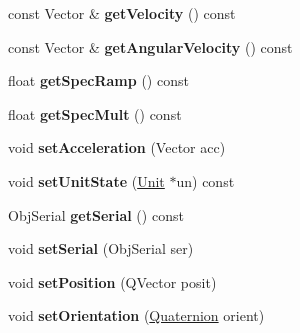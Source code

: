 \begin{DoxyCompactItemize}
\item 
const Vector \& {\bfseries get\+Velocity} () const \hypertarget{classClientState_a68087f4461e6837a58a32d695d1bbfd0}{}\label{classClientState_a68087f4461e6837a58a32d695d1bbfd0}

\item 
const Vector \& {\bfseries get\+Angular\+Velocity} () const \hypertarget{classClientState_ac19050a6f29a6f5a6e5f9dd0d5b5c216}{}\label{classClientState_ac19050a6f29a6f5a6e5f9dd0d5b5c216}

\item 
float {\bfseries get\+Spec\+Ramp} () const \hypertarget{classClientState_a9a1d6c1f4080ea5e6fb100fa4d7b4242}{}\label{classClientState_a9a1d6c1f4080ea5e6fb100fa4d7b4242}

\item 
float {\bfseries get\+Spec\+Mult} () const \hypertarget{classClientState_ae02b427f1c3439fa9c6752d1dcc9e4ab}{}\label{classClientState_ae02b427f1c3439fa9c6752d1dcc9e4ab}

\item 
void {\bfseries set\+Acceleration} (Vector acc)\hypertarget{classClientState_a812fa6fb3d2949775e90ba5134847d4c}{}\label{classClientState_a812fa6fb3d2949775e90ba5134847d4c}

\item 
void {\bfseries set\+Unit\+State} (\hyperlink{classUnit}{Unit} $\ast$un) const \hypertarget{classClientState_aec621385e79d33a80f21097a970c7912}{}\label{classClientState_aec621385e79d33a80f21097a970c7912}

\item 
Obj\+Serial {\bfseries get\+Serial} () const \hypertarget{classClientState_ab4e2ff85df0857c600b265b9459b92ad}{}\label{classClientState_ab4e2ff85df0857c600b265b9459b92ad}

\item 
void {\bfseries set\+Serial} (Obj\+Serial ser)\hypertarget{classClientState_abb156ffb85a143d472de857783ec0486}{}\label{classClientState_abb156ffb85a143d472de857783ec0486}

\item 
void {\bfseries set\+Position} (Q\+Vector posit)\hypertarget{classClientState_af4dab10fa684d59375402aa5f575b167}{}\label{classClientState_af4dab10fa684d59375402aa5f575b167}

\item 
void {\bfseries set\+Orientation} (\hyperlink{structQuaternion}{Quaternion} orient)\hypertarget{classClientState_a72518188418744c3b2543a34f62b22a7}{}\label{classClientState_a72518188418744c3b2543a34f62b22a7}


\end{DoxyCompactItemize}
